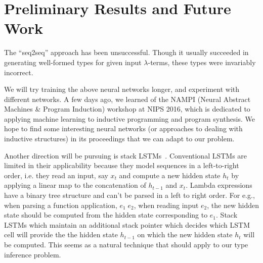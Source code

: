 \documentclass{amsart}
\begin{document}
\section{Preliminary Results and Future Work}

The ``seq2seq'' approach has been unsuccessful. Though it usually
succeeded in generating well-formed types for given input
$\lambda$-terms, these types were invariably incorrect.

We will try training the above neural networks longer, and experiment
with different networks.
A few days ago, we learned of the NAMPI (Neural Abstract Machines \&
Program Induction) workshop at NIPS 2016, which is dedicated to
applying machine learning to inductive programming and program
synthesis. We hope to find some interesting neural networks (or
approaches to dealing with inductive structures) in its proceedings
that we can adapt to our problem.

Another direction will be pursuing is stack LSTMs~\cite{DyerBLMS15}.
Conventional LSTMs are limited in their applicability because
they model sequences in a left-to-right order, i.e. they read an input,
say $x_t$ and compute a new hidden state $h_t$ by applying a linear map
to the concatenation of $h_{t-1}$ and $x_t$. Lambda expressions
have a binary tree structure and can't be parsed in a left to right order.
For e.g., when parsing a function application, $e_1 \; e_2$, when
reading input $e_2$, the new hidden state should be computed from
the hidden state corresponding to $e_1$. Stack LSTMs
which maintain an additional stack pointer which decides which
LSTM cell will provide the the hidden state $h_{t-1}$ on which
the new hidden state $h_t$ will be computed. This seems
as a natural technique that should apply to our type inference
problem.



\end{document}
